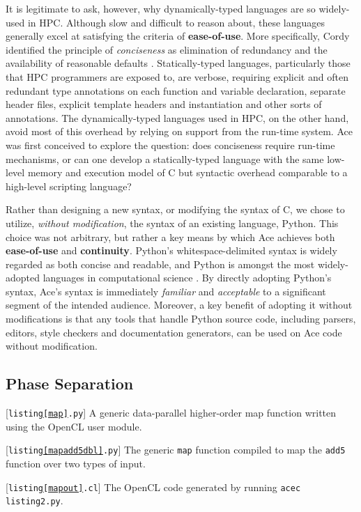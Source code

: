 \documentclass{sig-alternate}
\begin{document}
It is legitimate to ask, however, why dynamically-typed languages are so widely-used in HPC. Although slow and difficult to reason about, these languages generally excel at satisfying the criteria of \textbf{ease-of-use}. More specifically, Cordy identified the principle of \emph{conciseness} as elimination of
redundancy and the availability of reasonable defaults \cite{cordy1992hints}. Statically-typed languages, particularly those that HPC programmers are exposed to, are verbose, requiring explicit and often redundant type annotations on each function and variable declaration, separate header files, explicit template headers and  instantiation and other sorts of annotations.  The dynamically-typed languages used in HPC, on the other hand, avoid most of this overhead by relying on support from the run-time system. Ace was first conceived to explore the question: does conciseness require run-time mechanisms, or can one develop a statically-typed language with the same low-level memory and execution model of C but syntactic overhead comparable to a high-level scripting language? 

Rather than designing a new syntax, or modifying the syntax of C, we chose to utilize, \emph{without modification}, the syntax of an existing language, Python. This choice was not arbitrary, but rather a key means by which Ace achieves both \textbf{ease-of-use} and \textbf{continuity}. Python's whitespace-delimited syntax is widely regarded as both concise and readable, and Python is amongst the most widely-adopted languages in computational science \cite{pythonhpc}. By directly adopting Python's syntax, Ace's syntax is immediately \emph{familiar} and \emph{acceptable} to a significant segment of the intended audience. Moreover, a key benefit of adopting it without modifications is that any {tools} that handle Python source code, including parsers, editors, style checkers and documentation generators, can be used on Ace code without modification.

\subsection{Phase Separation}
\begin{codelisting}

\caption{[\texttt{listing\ref{map}.py}] A generic data-parallel higher-order map function written using the OpenCL user module.}
\label{map}
\end{codelisting}
\begin{codelisting}

\caption{[\texttt{listing\ref{mapadd5dbl}.py}] The generic \texttt{map} function compiled to map the \texttt{add5} function over two  types of input.}
\label{mapadd5dbl}
\end{codelisting}
\begin{codelisting}

\caption{[\texttt{listing\ref{mapout}.cl}] The OpenCL code generated by running \texttt{acec listing2.py}.}
\label{mapout}
\end{codelisting}
\end{document}
